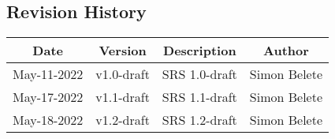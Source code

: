


\begin{center}
\section*{Revision History}
\end{center}


\doublespacing
\vspace{1.0cm}
\noindent

\begin{center}
\begin{tabular}{ |c|c|c|c| } 
 \hline
 \textbf{Date} & \textbf{Version} & \textbf{Description} & \textbf{Author} \\ 
 \hline
 May-11-2022 & v1.0-draft & SRS 1.0-draft & Simon Belete \\
  \hline
 May-17-2022 & v1.1-draft & SRS 1.1-draft & Simon Belete \\
  \hline
 May-18-2022 & v1.2-draft & SRS 1.2-draft & Simon Belete \\
 \hline
\end{tabular}
\end{center}